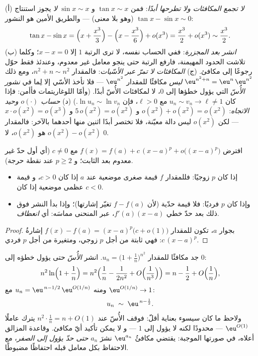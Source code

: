 \begin{remark}
(أ) \emph{لا تجمع المكافئات ولا تطرحها أبدًا}: فمن $\tan x \sim
x$ و $\sin x \sim x$ \emph{لا} يجوز استنتاج $\tan x -
\sin x \sim 0$ (وهو بلا معنى) --- والطريق الأمين هو
النشور:
\[
\tan x - \sin x
= \Bigl(x + \frac{x^3}{3}\Bigr) - \Bigl(x - \frac{x^3}{6}\Bigr)
+ o(x^3) = \frac{x^3}{2} + o(x^3) \sim \frac{x^3}{2} .
\]
(ب) \emph{انشر بعد المجزرة}: ففي الحساب نفسه،
لا ترى الرتبة $1$ إلا $x - x = 0$؛ وكلما تلاشت الحدود المهيمنة،
فارفع الرتبة حتى ينجو معامل غير معدوم، وعندئذ
فقط حوّل رجوعًا إلى مكافئ. (ج) \emph{المكافئات لا
تمرّ عبر الأسّيات}: فالمقدار $n^2 + n \sim n^2$، ومع ذلك
$\eu^{n^2+n} = \eu^{n}\,\eu^{n^2}$ \emph{ليس} مكافئًا للمقدار
$\eu^{n^2}$ --- فلا تأخذ الأسّي إلا لِما في \emph{نشور الأُسّ}
التي يؤول خطؤها إلى $0$، لا لمكافئات
الأُسّ أبدًا. (وأمّا اللوغاريتمات فأأمن: فإذا كان $u_n \sim v_n \to \ell \neq
1$ مع $\ell > 0$، فإن $\ln u_n \sim \ln v_n$.) (د) \emph{حساب
$o(\cdot)$ وحيد الاتجاه}: $o(x^2) + o(x^2) =
o(x^2)$ و $5\,o(x^2) = o(x^2)$ و $x\cdot o(x^2) = o(x^3)$ --- لكن
$o(x^2)$ ليس دالة معيّنة، فلا تختصر أبدًا اثنين
منها أحدهما بالآخر: فالمقدار $o(x^2) - o(x^2)$ هو $o(x^2)$، لا
$0$.
\end{remark}

\begin{proposition}\label{prop:b1:taylor:local}
افترض $f(x) = f(a) + c\,(x - a)^p + o\bigl((x-a)^p\bigr)$ مع $c
\neq 0$ (أي أول حدّ غير معدوم بعد الثابت؛ و $p \geq 2$ عند
نقطة حرجة).
\begin{itemize}
  \item إذا كان $p$ زوجيًا: فللمقدار $f$ قيمة صغرى موضعية عند $a$ إذا كان $c > 0$، و
        قيمة عظمى موضعية إذا كان $c < 0$.
  \item وإذا كان $p$ فرديًا: فلا قيمة حدّية (لأن $f - f(a)$ تغيّر إشارتها)؛
        وإذا بدأ النشر فوق ذلك بعد حدّ خطي $f'(a)(x
        - a)$، عبر المنحنى مماسَه: أي \emph{انعطاف}.
\end{itemize}
\end{proposition}

\begin{proof}
بجوار $a$، تكون للمقدار $f(x) - f(a) = (x-a)^p\bigl(c + o(1)\bigr)$ إشارةُ
$c\,(x-a)^p$: فهي ثابتة من أجل $p$ زوجي، ومتغيرة من أجل $p$ فردي.
\end{proof}

\begin{example}\label{ex:b1:taylor:expdiscipline}
جد مكافئًا للمقدار $u_n = \bigl(1 + \frac1n\bigr)^{n^2}$.
انشر \emph{الأُسّ} حتى يؤول خطؤه إلى $0$:
\[
n^2 \ln\Bigl(1 + \frac1n\Bigr)
= n^2\Bigl(\frac1n - \frac{1}{2n^2} +
O\Bigl(\frac{1}{n^3}\Bigr)\Bigr)
= n - \frac12 + O\Bigl(\frac1n\Bigr),
\]
ومنه $u_n = \eu^{\,n - 1/2}\,\eu^{O(1/n)}$ مع $\eu^{O(1/n)} \to
1$:
\[
u_n \;\sim\; \eu^{\,n - \frac12} .
\]
ولاحظ ما كان سيسوء بعناية أقلّ: فوقف
الأُسّ عند $n^2\cdot\frac1n = n + O(1)$ يترك عاملًا
$\eu^{O(1)}$ --- محدودًا لكنه لا يؤول إلى $1$ --- و
لا يمكن تأكيد أيّ مكافئ. وقاعدة
المزالق أعلاه، في صورتها الموجبة: يقتضي مكافئُ
$\eu^{a_n}$ نشرَ $a_n$ \emph{حتى حدّ
يؤول إلى الصفر}، مع الاحتفاظ بكل معامل قبله
احتفاظًا مضبوطًا.
\end{example}

